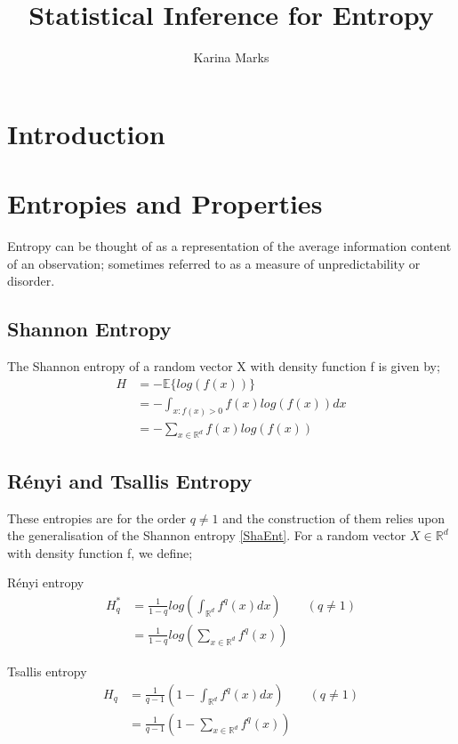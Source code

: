 \documentclass{article}
\title{Statistical Inference for Entropy}
\author{Karina Marks}
\begin{document}
\maketitle
\section{Introduction}



\section{Entropies and Properties}

Entropy can be thought of as a representation of the average information content of an observation; sometimes referred to as a measure of unpredictability or disorder. 

\subsection{Shannon Entropy}
The Shannon entropy of a random vector X with density function f is given by;
\begin{align} \label{ShaEnt}
H &= - \mathbb{E} \{log(f(x))\} \\
&= - \int_{x : f(x) > 0} f(x) log(f(x)) dx \\
&= - \sum_{x \in \mathbb{R}^{d}} f(x) log(f(x))
\end{align}

\subsection{ R\'enyi and Tsallis Entropy}
These entropies are for the order $q \neq 1$ and the construction of them relies upon the generalisation of the Shannon entropy \ref{ShaEnt}. For a random vector $X \in \mathbb{R}^d$ with density function f, we define;

R\'enyi entropy
\begin{align} \label{RenEnt}
H_{q}^{*} &= \frac{1}{1-q} log \left( \int_{\mathbb{R}^d} f^q (x) dx \right) \quad  \quad (q \neq 1) \\
&=  \frac{1}{1-q} log \left( \sum_{x \in \mathbb{R}^{d}} f^q (x) \right)
\end{align}

Tsallis entropy
\begin{align} \label{TsaEnt}
H_{q} &= \frac{1}{q-1} \left(1 - \int_{\mathbb{R}^d} f^q (x) dx \right)  \quad  \quad (q \neq 1) \\
&=  \frac{1}{q-1} \left(1 - \sum_{x \in \mathbb{R}^d} f^q (x) \right)
\end{align}
\end{document}
